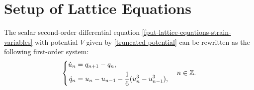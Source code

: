\section{Setup of Lattice Equations}

The scalar second-order differential equation \cref{fput-lattice-equations-strain-variables} with potential \(V\) given by \cref{truncated-potential} can be rewritten as the following first-order system:
\begin{equation}\label{first-order-lattice-eqns}
	\left\{\begin{aligned}\dot u _n &= q_{n+1} - q_n, \\
	\dot q_n &= u_n - u_{n-1} - \frac{1} 6 ( u_n^3 - u^3_{n-1}),\end{aligned} \right. \quad n \in \mathbb{Z}.
\end{equation}






